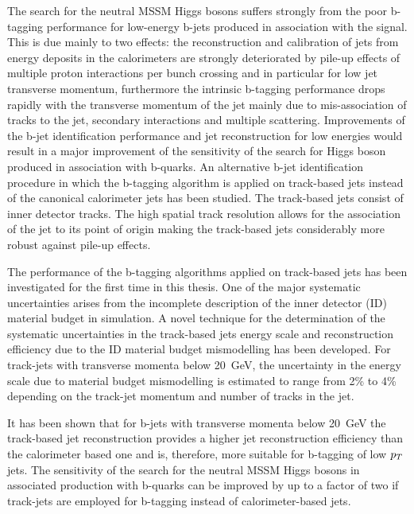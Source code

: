 The search for the neutral MSSM Higgs bosons suffers  strongly from the 
poor b-tagging performance for  low-energy b-jets produced in association 
with the signal. This is due mainly to two effects:
the reconstruction and calibration of jets from energy deposits in the calorimeters are strongly 
deteriorated by pile-up effects of multiple proton interactions per bunch crossing and 
in particular for low jet transverse momentum, furthermore the intrinsic b-tagging 
performance drops rapidly with the transverse momentum of the jet  mainly due to mis-association of 
tracks to the jet, secondary interactions and multiple scattering.
Improvements of the b-jet identification performance and jet reconstruction for low energies would result 
in a major improvement of the sensitivity of the search  for Higgs boson produced  in association with b-quarks.
An alternative b-jet identification procedure in which the b-tagging algorithm is applied on 
track-based jets instead of the  canonical calorimeter jets has been studied.
The track-based jets consist of inner detector tracks. The high spatial track resolution
allows for the association of the jet to its point of origin making the track-based jets 
considerably more robust against pile-up effects.

The performance of the b-tagging algorithms applied on track-based jets has been investigated for the first time in this thesis.
One of the major systematic uncertainties arises from the incomplete description of the inner detector (ID) material
 budget in simulation.
A novel technique for the determination of  the systematic uncertainties in the track-based jets energy scale and
reconstruction efficiency  due to the ID material budget mismodelling  has been developed. 
For track-jets with transverse momenta below 20~GeV, the  uncertainty  in the energy scale  due to 
material budget mismodelling is estimated to range from 2\% to 4\% depending on the track-jet 
momentum and number of  tracks in the jet.

It has been shown that for b-jets with transverse momenta below 20~GeV the track-based jet reconstruction provides a higher
jet reconstruction efficiency than the calorimeter based one and is, therefore, more suitable  for
b-tagging of low $p_{T}$ jets. The sensitivity of the search for the neutral MSSM Higgs bosons
in associated production with b-quarks can be improved by
up to a factor of two if track-jets are employed for b-tagging instead of  calorimeter-based jets.

